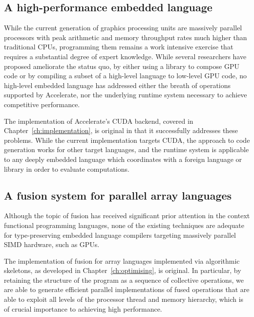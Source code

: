 \subsection{A high-performance embedded language}

While the current generation of graphics processing units are massively parallel
processors with peak arithmetic and memory throughput rates much higher than
traditional CPUs, programming them remains a work intensive exercise that
requires a substantial degree of expert knowledge. While several researchers
have proposed ameliorate the status quo, by either using a library to compose
GPU code or by compiling a subset of a high-level language to low-level GPU
code, no high-level embedded language has addressed either the breath of
operations supported by Accelerate, nor the underlying runtime system necessary
to achieve competitive performance.

The implementation of Accelerate's CUDA backend, covered in
Chapter~\ref{ch:implementation}, is original in that it successfully addresses
these problems. While the current implementation targets CUDA, the approach to
code generation works for other target languages, and the runtime system is
applicable to any deeply embedded language which coordinates with a foreign
language or library in order to evaluate computations.


\subsection{A fusion system for parallel array languages}

Although the topic of fusion has received significant prior attention in
the context functional programming languages, none of the existing techniques
are adequate for type-preserving embedded language compilers targeting massively
parallel SIMD hardware, such as GPUs.

The implementation of fusion for array languages implemented via algorithmic
skeletons, as developed in Chapter~\ref{ch:optimising}, is original. In
particular, by retaining the structure of the program as a sequence of
collective operations, we are able to generate efficient parallel
implementations of fused operations that are able to exploit all levels of the
processor thread and memory hierarchy, which is of crucial importance to
achieving high performance.



%
%


